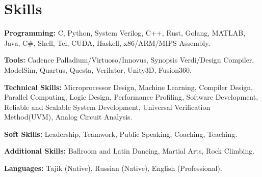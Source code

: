 \documentclass[letterpaper,11pt]{article}
\newcommand{\resumeSubHeadingListStart}{\begin{itemize}[leftmargin=0.15in, label={}]}
\newcommand{\resumeSubHeadingListEnd}{\end{itemize}}
\begin{document}
\section{Skills}
  \vspace{2pt}
  \resumeSubHeadingListStart
    \small{\item{
        \textcolor{secondary_color}{\textbf{Programming:}}{ C, Python, System Verilog, C++, Rust, Golang, MATLAB, Java, C\#, Shell, Tcl, CUDA, Haskell, x86/ARM/MIPS Assembly.} \\ \vspace{3pt}
        
        \textcolor{secondary_color}{\textbf{Tools:}}{ Cadence Palladium/Virtuoso/Innovus, Synopsis Verdi/Design Compiler, ModelSim, Quartus, Questa, Verilator, Unity3D, Fusion360.} \\ \vspace{3pt}

        \textcolor{secondary_color}{\textbf{Technical Skills:}}{ Microprocessor Design, Machine Learning, Compiler Design, Parallel Computing, Logic Design, Performance Profiling, Software Development, Reliable and Scalable System Development, Universal Verification Method(UVM), Analog Circuit Analysis.} \\ \vspace{3pt}
        
        \textcolor{secondary_color}{\textbf{Soft Skills:}}{ Leadership, Teamwork, Public Speaking, Coaching, Teaching.} \\ \vspace{3pt}
        
        \textcolor{secondary_color}{\textbf{Additional Skills:}}{ Ballroom and Latin Dancing, Martial Arts, Rock Climbing.} \\ \vspace{3pt}

        \textcolor{secondary_color}{\textbf{Languages:}}{ Tajik (Native), Russian (Native), English (Professional).}
        
    }}
  \resumeSubHeadingListEnd



\end{document}
